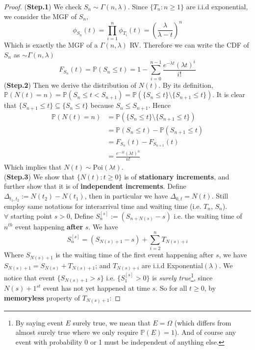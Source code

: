 \documentclass[a4paper, 10pt]{article}
\theoremstyle{definition}
\theoremstyle{hSol}
\begin{document}
\begin{proof} (\textbf{Step.1}) We check $S_n \sim \Gamma(n, \lambda)$. Since $\{T_n: n\geq 1\}$ are i.i.d exponential, we consider the MGF of $S_n$,
\begin{equation}
  \phi_{S_n}(t) = \prod_{i=1}^n \phi_{T_i}(t) = \left(\frac{\lambda}{\lambda-t}\right)^n
\end{equation}
Which is exactly the MGF of a $\Gamma(n,\lambda)$ RV. Therefore we can write the CDF of $S_n$ as $\sim \Gamma(n,\lambda)$
\begin{equation}
  F_{S_n}(t) = \mathbb{P}\left(S_n \leq t\right) = 1-\sum_{i=0}^{n-1} \frac{e^{-\lambda t}(\lambda t)^i}{i!}
\end{equation}
(\textbf{Step.2}) Then we derive the distribution of $N(t)$. By its definition, $\mathbb{P}\left(N(t)=n\right)=\mathbb{P}\left(S_n \leq t< S_{n+1}\right)=\mathbb{P}\left(\{S_n\leq t\}\setminus \{S_{n+1}\leq t\}\right)$. It is clear that $\{S_{n+1}\leq t\} \subseteq \{S_n \leq t\}$ because $S_n \leq S_{n+1}$. Hence
\begin{equation}
  \begin{split}
    \mathbb{P}\left(N(t)=n\right)&=\mathbb{P}\left(\{S_n\leq t\}\setminus \{S_{n+1}\leq t\}\right) \\
    &= \mathbb{P}\left(S_{n}\leq t\right)-\mathbb{P}\left(S_{n+1}\leq t\right)\\
    &= F_{S_n}(t) - F_{S_{n+1}}(t) \\
    &= \frac{e^{-\lambda t}(\lambda t)^n}{n!}
  \end{split}
\end{equation}
Which implies that $N(t)\sim \text{Poi}(\lambda t)$. \\
(\textbf{Step.3}) We show that $\{N(t): t\geq 0\}$ is of \textbf{stationary increments}, and further show that it is of \textbf{independent increments}. Define $\Delta_{t_1, t_2} := N(t_2)-N(t_1)$, then in particular we have $\Delta_{0,t}=N(t)$. Still employ same notations for interarrival time and waiting time (i.e. $T_n$, $S_n$). \\
$\forall$ starting point $s>0$, Define $S_n^{[s]}:=(S_{n+N(s)}-s)$ i.e. the waiting time of $n^{th}$ event happening \textbf{after} $s$. We have
\begin{equation}
  S_n^{[s]} = (S_{N(s)+1}-s) + \sum_{i=2}^{n} T_{N(s)+i}
\end{equation}
Where $S_{N(s)+1}$ is the waiting time of the first event happening after $s$, we have $S_{N(s)+1}=S_{N(s)}+T_{N(s)+1}$; and $T_{N(s)+i}$ are i.i.d Exponential$(\lambda)$. We notice that event $\{S_{N(s)+1}>s\}$ i.e. $\{S_{1}^{[s]}>0\}$ is \textit{surely true}\footnote{By saying event $E$ surely true, we mean that $E=\Omega$ (which differs from almost surely true where we only require $\mathbb{P}\left(E\right)=1$). And of course any event with probability 0 or 1 must be independent of anything else.}, since $N(s)+1^{st}$ event has not yet happened at time $s$. So for all $t\geq 0$, by \textbf{memoryless} property of $T_{N(s)+1}$:

\end{proof}
\end{document}
